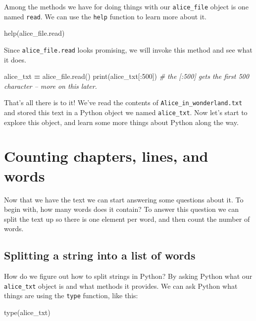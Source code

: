 \documentclass[]{book}
\newenvironment{Shaded}{\begin{snugshade}}{\end{snugshade}}
\newcommand{\DecValTok}[1]{\textcolor[rgb]{0.00,0.00,0.81}{#1}}
\newcommand{\CommentTok}[1]{\textcolor[rgb]{0.56,0.35,0.01}{\textit{#1}}}
\newcommand{\OperatorTok}[1]{\textcolor[rgb]{0.81,0.36,0.00}{\textbf{#1}}}
\newcommand{\BuiltInTok}[1]{#1}
\newcommand{\NormalTok}[1]{#1}
\begin{document}
Among the methods we have for doing things with our \texttt{alice\_file}
object is one named \texttt{read}. We can use the \texttt{help} function
to learn more about it.

\begin{Shaded}
\begin{Highlighting}[]
\BuiltInTok{help}\NormalTok{(alice_file.read)}
\end{Highlighting}
\end{Shaded}

Since \texttt{alice\_file.read} looks promising, we will invoke this
method and see what it does.

\begin{Shaded}
\begin{Highlighting}[]
\NormalTok{alice_txt }\OperatorTok{=}\NormalTok{ alice_file.read()}
\BuiltInTok{print}\NormalTok{(alice_txt[:}\DecValTok{500}\NormalTok{]) }\CommentTok{# the [:500] gets the first 500 character -- more on this later.}
\end{Highlighting}
\end{Shaded}

That's all there is to it! We've read the contents of
\texttt{Alice\_in\_wonderland.txt} and stored this text in a Python
object we named \texttt{alice\_txt}. Now let's start to explore this
object, and learn some more things about Python along the way.

\section{Counting chapters, lines, and
words}\label{counting-chapters-lines-and-words}

Now that we have the text we can start answering some questions about
it. To begin with, how many words does it contain? To answer this
question we can split the text up so there is one element per word, and
then count the number of words.

\subsection{Splitting a string into a list of
words}\label{splitting-a-string-into-a-list-of-words}

How do we figure out how to split strings in Python? By asking Python
what our \texttt{alice\_txt} object is and what methods it provides. We
can ask Python what things are using the \texttt{type} function, like
this:

\begin{Shaded}
\begin{Highlighting}[]
\BuiltInTok{type}\NormalTok{(alice_txt)}
\end{Highlighting}
\end{Shaded}
\end{document}
